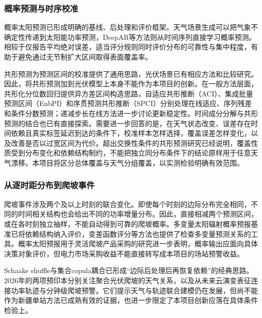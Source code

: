\subsubsection{概率预测与时序校准}
概率太阳预测已形成明确的基线、后处理和评价框架\cite{gneiting2023solar}。天气场景生成可以把气象不确定性传递到太阳能功率预测，DeepAR等方法则从时间序列直接学习概率预测\cite{sun2020scenario,salinas2020deepar}。相较于仅报告平均绝对误差，适当评分规则同时评价分布的可靠性与集中程度，有助于避免通过无节制扩大区间取得表面覆盖率\cite{gneiting2007proper}。

共形预测为预测区间的校准提供了通用思路，光伏场景已有相应方法和比较研究\cite{renkema2024conformal,solarcp2025comparative}。因此，将共形预测加到光伏模型上本身不能作为本项目的创新。在一般方法层面，共形化分位数回归提供异方差区间构造思路，自适应共形推断（ACI）、集成批量预测区间（EnbPI）和序贯预测共形推断（SPCI）分别处理在线适应、序列残差和条件分数预测；递减步长在线方法进一步讨论更新稳定性\cite{romano2019cqr,gibbs2021aci,xu2021enbpi,xu2023spci,angelopoulos2024online}。时间成分分解与共形预测的结合也已有直接探索\cite{prinzhorn2024decomposition}。需要进一步回答的是，在天气状态改变、误差存在时间依赖且真实标签延迟到达的条件下，校准样本怎样选择，覆盖误差怎样变化，以及改善是否以过宽区间为代价。超出交换性条件的共形预测研究已经说明，覆盖性质受到分布变化和依赖结构制约，不能把独立同分布条件下的结论原样用于任意天气漂移\cite{barber2023beyond}。本项目将区分总体覆盖与天气分组覆盖，以实测检验明确有效范围。

\subsubsection{从逐时距分布到爬坡事件}
爬坡事件涉及两个及以上时刻的联合变化。即使每个时刻的边际分布完全相同，不同的时间相关结构也会给出不同的功率增量分布。因此，直接相减两个预测区间，或在各时刻独立抽样，不能自动得到可靠的爬坡概率。多变量太阳辐射概率预报基准已将依赖结构纳入评价，变差函数评分等方法也提供了检查多变量预测关系的工具\cite{meer2021benchmark,scheuerer2015variogram}。概率太阳预报用于灵活爬坡产品采购的研究进一步表明，概率输出应面向具体决策对象评价\cite{hobbs2022ramp}，但电力市场采购收益不能直接转写成本项目的场站预警收益。

Schaake shuffle与集合copula耦合已形成“边际后处理后再恢复依赖”的经典思路\cite{clark2004schaake,schefzik2013ecc}。2026年的两项预印本分别关注聚合光伏爬坡的天气关系，以及从未来云演变表征连接功率轨迹与分钟级爬坡预警\cite{lanzilao2026ramp,wang2026skyramp}。它们提示天气与轨迹联合建模仍在发展，但尚不能作为新疆单站方法已成熟有效的证据，也进一步限定了本项目创新应落在具体条件检验上。

